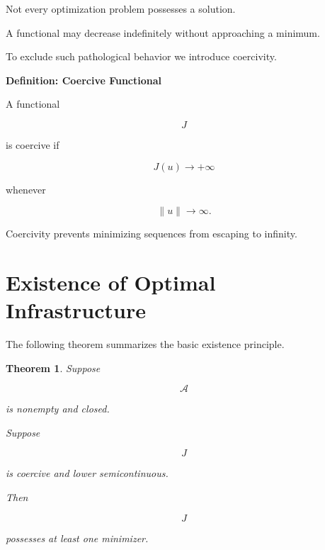 \documentclass[11pt,fleqn]{book}
\numberwithin{equation}{chapter}
\newenvironment{definition}[1]
  {\begin{definitionEnv}
   \noindent\textbf{Definition: #1}\par\smallskip}
  {\end{definitionEnv}}
\theoremstyle{plain}
\newtheorem{theorem}{Theorem}[chapter]
\theoremstyle{definition}
\theoremstyle{remark}
\begin{document}
Not every optimization problem possesses a solution.

A functional may decrease indefinitely without approaching a minimum.

To exclude such pathological behavior we introduce coercivity.


\begin{definition}{Coercive Functional}

A functional

\[
J
\]

is coercive if

\[
J(u)
\rightarrow
+\infty
\]

whenever

\[
\|u\|
\rightarrow
\infty.
\]

\end{definition}

Coercivity prevents minimizing sequences from escaping to infinity.


\section{Existence of Optimal Infrastructure}

The following theorem summarizes the basic existence principle.


\begin{theorem}

Suppose

\[
\mathcal A
\]

is nonempty and closed.

Suppose

\[
J
\]

is coercive and lower semicontinuous.

Then

\[
J
\]

possesses at least one minimizer.

\end{theorem}
\end{document}
